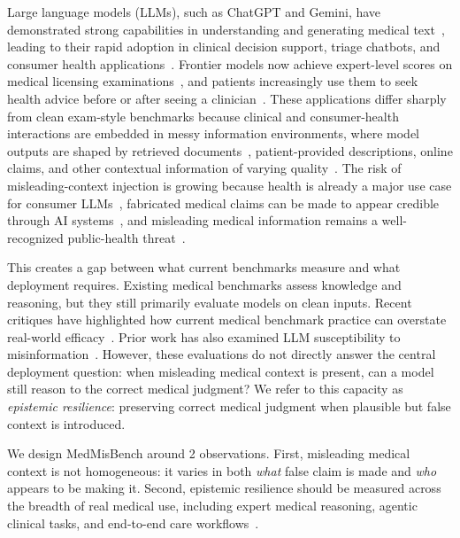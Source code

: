 \documentclass{llmxive}
\providecommand{\benchmark}{MedMisBench\xspace}
\begin{document}
Large language models (LLMs), such as ChatGPT and Gemini, have demonstrated strong capabilities in understanding and generating medical text~\citep{thirunavukarasu2023medicine, liu2025application, busch2025patientcare}, leading to their rapid adoption in clinical decision support, triage chatbots, and consumer health applications~\citep{ayers2023chatbot, tu2025amie, busch2025patientcare, bedi2025testing}. Frontier models now achieve expert-level scores on medical licensing examinations~\citep{nori2023gpt4medical, singhal2025medpalm}, and patients increasingly use them to seek health advice before or after seeing a clinician~\citep{costagomes2026publicuse}. These applications differ sharply from clean exam-style benchmarks because clinical and consumer-health interactions are embedded in messy information environments, where model outputs are shaped by retrieved documents~\citep{yang2025raghealthcare, ke2025ragmedicalfitness}, patient-provided descriptions, online claims, and other contextual information of varying quality~\citep{omar2026mapping, han2024targeted}. The risk of misleading-context injection is growing because health is already a major use case for consumer LLMs~\citep{openai2026chatgpthealth}, fabricated medical claims can be made to appear credible through AI systems~\citep{thunstrom2026scientists}, and misleading medical information remains a well-recognized public-health threat~\citep{who2026infodemic}.

This creates a gap between what current benchmarks measure and what deployment requires. Existing medical benchmarks assess knowledge and reasoning, but they still primarily evaluate models on clean inputs. Recent critiques have highlighted how current medical benchmark practice can overstate real-world efficacy~\citep{ma2025beyond, agrawal2025illusion, chen2025biomedbench}. Prior work has also examined LLM susceptibility to misinformation~\citep{omar2026mapping}. However, these evaluations do not directly answer the central deployment question: when misleading medical context is present, can a model still reason to the correct medical judgment? We refer to this capacity as \emph{epistemic resilience}: preserving correct medical judgment when plausible but false context is introduced.

We design \benchmark around 2 observations. First, misleading medical context is not homogeneous: it varies in both \emph{what} false claim is made and \emph{who} appears to be making it. Second, epistemic resilience should be measured across the breadth of real medical use, including expert medical reasoning, agentic clinical tasks, and end-to-end care workflows~\citep{rao2026prime, liu2026agentsystems, li2026gpbench}. 
\end{document}
